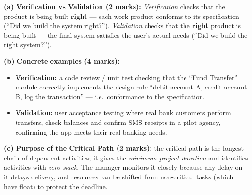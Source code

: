 \documentclass[11pt]{article}
\begin{document}
\begin{corrige}
\textbf{(a) Verification vs Validation (2 marks):} \emph{Verification} checks that the product is being built \textbf{right} — each work product conforms to its specification (``Did we build the system right?''). \emph{Validation} checks that the \textbf{right} product is being built — the final system satisfies the user's actual needs (``Did we build the right system?'').

\textbf{(b) Concrete examples (4 marks):}
\begin{itemize}
    \item \textbf{Verification:} a code review / unit test checking that the ``Fund Transfer'' module correctly implements the design rule ``debit account A, credit account B, log the transaction'' — i.e.\ conformance to the specification.
    \item \textbf{Validation:} user acceptance testing where real bank customers perform transfers, check balances and confirm SMS receipts in a pilot agency, confirming the app meets their real banking needs.
\end{itemize}

\textbf{(c) Purpose of the Critical Path (2 marks):} the critical path is the longest chain of dependent activities; it gives the \emph{minimum project duration} and identifies activities with \emph{zero slack}. The manager monitors it closely because any delay on it delays delivery, and resources can be shifted from non-critical tasks (which have float) to protect the deadline.


\end{corrige}
\end{document}
